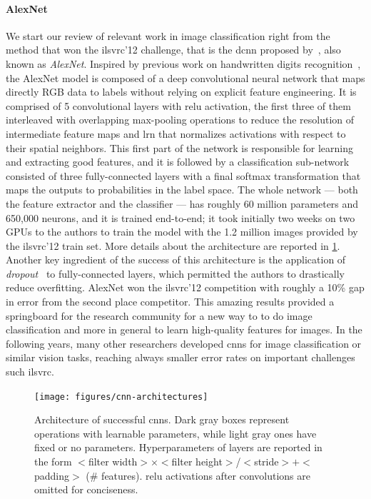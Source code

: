 \paragraph{AlexNet}
We start our review of relevant work in image classification right from the method that won the \gls{ilsvrc}'12 challenge, that is the \gls{dcnn} proposed by~\citet{krizhevsky2012imagenet}, also known as \emph{AlexNet}.
Inspired by previous work on handwritten digits recognition~\cite{lecun1989backpropagation}, the AlexNet model is composed of a deep convolutional neural network that maps directly RGB data to labels without relying on explicit feature engineering.
It is comprised of 5 convolutional layers with \gls{relu} activation, the first three of them interleaved with overlapping max-pooling operations to reduce the resolution of intermediate feature maps and \gls{lrn} that normalizes activations with respect to their spatial neighbors.
This first part of the network is responsible for learning and extracting good features, and it is followed by a classification sub-network consisted of three fully-connected layers with a final softmax transformation that maps the outputs to probabilities in the label space.
The whole network --- both the feature extractor and the classifier --- has roughly 60 million parameters and 650,000 neurons, and it is trained end-to-end;
it took initially two weeks on two GPUs to the authors to train the model with the 1.2 million images provided by the \gls{ilsvrc}'12 train set.
More details about the architecture are reported in \ref{fig:back:cnn-architectures}.
Another key ingredient of the success of this architecture is the application of \emph{dropout}~\cite{hinton2012improving} to fully-connected layers, which permitted the authors to drastically reduce overfitting.
AlexNet won the \gls{ilsvrc}'12 competition with roughly a 10\% gap in error from the second place competitor.
This amazing results provided a springboard for the research community for a new way to to do image classification and more in general to learn high-quality features for images.
In the following years, many other researchers developed \glspl{cnn} for image classification or similar vision tasks, reaching always smaller error rates on important challenges such \gls{ilsvrc}.

\begin{figure}
    \centering
    \texttt{[image: figures/cnn-architectures]}
    \caption{Architecture of successful \glspl{cnn}.
Dark gray boxes represent operations with learnable parameters, while light gray ones have fixed or no parameters.
Hyperparameters of layers are reported in the form
$<$filter width$>\times<$filter height$>$/$<$stride$>+<$padding$>$ (\# features).
\gls{relu} activations after convolutions are omitted for conciseness.}
    \label{fig:back:cnn-architectures}
\end{figure}

